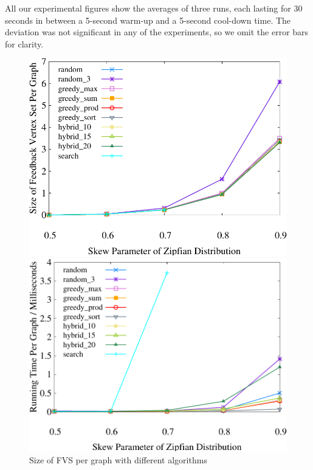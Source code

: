 All our experimental figures show the averages of three runs, each lasting for 30 seconds in between a 5-second warm-up and a 5-second cool-down time. The deviation was not significant in any of the experiments, so we omit the error bars for clarity.

\begin{figure}[t]
    \centering
    \begin{minipage}[b]{0.32\linewidth}
        \centering
        \includegraphics[width=\textwidth]{./exp_fig/fvs/fvs}
        \vspace{-2em}
        \caption{Size of FVS per graph with different algorithms}
        \label{fig:fvs:fvs}
    \end{minipage}
    \begin{minipage}[b]{0.32\linewidth}
        \centering
        \includegraphics[width=\textwidth]{./exp_fig/fvs/latency}

\end{minipage}
\end{figure}
